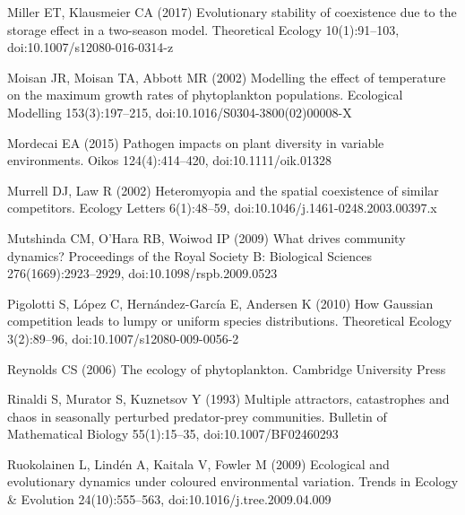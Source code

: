 \documentclass[a4paper,12pt]{article}
\begin{document}
\begin{thebibliography}{68}
Miller ET, Klausmeier CA (2017) Evolutionary stability of coexistence due to
  the storage effect in a two-season model. Theoretical Ecology 10(1):91--103,
  doi:{10.1007/s12080-016-0314-z}

Moisan JR, Moisan TA, Abbott MR (2002) Modelling the effect of temperature on
  the maximum growth rates of phytoplankton populations. Ecological Modelling
  153(3):197--215, doi:{10.1016/S0304-3800(02)00008-X}

Mordecai EA (2015) Pathogen impacts on plant diversity in variable
  environments. Oikos 124(4):414--420, doi:{10.1111/oik.01328}

Murrell DJ, Law R (2002) Heteromyopia and the spatial coexistence of similar
  competitors. Ecology Letters 6(1):48--59,
  doi:{10.1046/j.1461-0248.2003.00397.x}

Mutshinda CM, O'Hara RB, Woiwod IP (2009) What drives community dynamics?
  Proceedings of the Royal Society B: Biological Sciences 276(1669):2923--2929,
  doi:{10.1098/rspb.2009.0523}

Pigolotti S, L\'{o}pez C, Hern\'{a}ndez-Garc\'{i}a E, Andersen K (2010) How
  {Gaussian} competition leads to lumpy or uniform species distributions.
  Theoretical Ecology 3(2):89--96, doi:{10.1007/s12080-009-0056-2}

Reynolds CS (2006) The ecology of phytoplankton. Cambridge University Press

Rinaldi S, Murator S, Kuznetsov Y (1993) Multiple attractors, catastrophes and
  chaos in seasonally perturbed predator-prey communities. Bulletin of
  Mathematical Biology 55(1):15--35, doi:{10.1007/BF02460293}

Ruokolainen L, Lind\'{e}n A, Kaitala V, Fowler M (2009) Ecological and
  evolutionary dynamics under coloured environmental variation. Trends in
  Ecology \& Evolution 24(10):555--563, doi:{10.1016/j.tree.2009.04.009}


\end{thebibliography}
\end{document}
